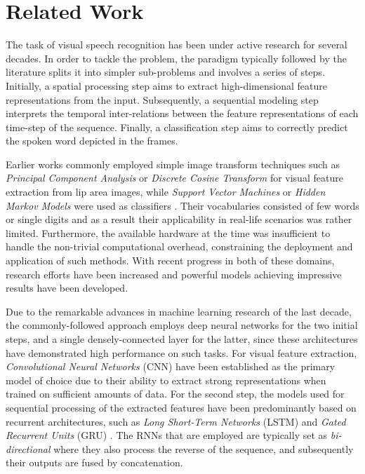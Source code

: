 \section{Related Work}
\label{sec:related}

The task of visual speech recognition has been under active research for several decades.
In order to tackle the problem, the paradigm typically followed by the literature splits it into simpler sub-problems and involves a series of steps.
Initially, a spatial processing step aims to extract high-dimensional feature representations from the input.
Subsequently, a sequential modeling step interprets the temporal inter-relations between the feature representations of each time-step of the sequence.
Finally, a classification step aims to correctly predict the spoken word depicted in the frames.

Earlier works commonly employed simple image transform techniques such as \textit{Principal Component Analysis} or \textit{Discrete Cosine Transform} for visual feature extraction from lip area images, while \textit{Support Vector Machines} or \textit{Hidden Markov Models} were used as classifiers \cite{potamianos2003recent}.
Their vocabularies consisted of few words or single digits and as a result their applicability in real-life scenarios was rather limited.
Furthermore, the available hardware at the time was insufficient to handle the non-trivial computational overhead, constraining the deployment and application of such methods.
With recent progress in both of these domains, research efforts have been increased and powerful models achieving impressive results have been developed.

Due to the remarkable advances in machine learning research of the last decade, the commonly-followed approach employs deep neural networks for the two initial steps, and a single densely-connected layer for the latter, since these architectures have demonstrated high performance on such tasks.
For visual feature extraction, \textit{Convolutional Neural Networks} (CNN) have been established as the primary model of choice due to their ability to extract strong representations when trained on sufficient amounts of data.
For the second step, the models used for sequential processing of the extracted features have been predominantly based on recurrent architectures, such as \textit{Long Short-Term Networks} (LSTM) \cite{chung2018learning, stafylakis2017deep, stafylakis2018pushing} and \textit{Gated Recurrent Units} (GRU) \cite{xu2020watch, miao2020part, liu2021robust}.
The RNNs that are employed are typically set as \textit{bi-directional} where they also process the reverse of the sequence, and subsequently their outputs are fused by concatenation.


